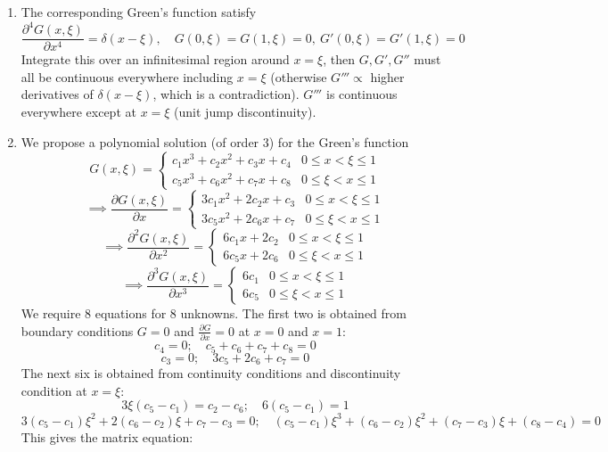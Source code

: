 \documentclass[a4paper]{article}
\begin{document}
\begin{ans}\leavevmode
\begin{enumerate}[label=(\roman*)]
    \item The corresponding Green's function satisfy
    $$\frac{\partial^4G(x,\xi)}{\partial x^4}=\delta(x-\xi),\quad G(0,\xi)=G(1,\xi)=0,~G'(0,\xi)=G'(1,\xi)=0$$
    Integrate this over an infinitesimal region around $x=\xi$, then $G,G',G''$ must all be continuous everywhere including $x=\xi$ (otherwise $G'''\propto$ higher derivatives of $\delta(x-\xi)$, which is a contradiction). $G'''$ is continuous everywhere except at $x=\xi$ (unit jump discontinuity).
    \item We propose a polynomial solution (of order 3) for the Green's function
    $$G(x,\xi)=
    \left\{
        \begin{array}{ll}
      c_1x^3+c_2x^2+c_3x+c_4 & 0\leq x<\xi\leq 1 \\
      c_5x^3+c_6x^2+c_7x+c_8 & 0\leq \xi<x\leq 1
        \end{array}
    \right.$$
    $$\implies\frac{\partial G(x,\xi)}{\partial x}=
    \left\{
        \begin{array}{ll}
      3c_1x^2+2c_2x+c_3 & 0\leq x<\xi\leq 1 \\
      3c_5x^2+2c_6x+c_7 & 0\leq \xi<x\leq 1
        \end{array}
    \right.$$
    $$\implies\frac{\partial^2G(x,\xi)}{\partial x^2}=
    \left\{
        \begin{array}{ll}
      6c_1x+2c_2 & 0\leq x<\xi\leq 1 \\
      6c_5x+2c_6 & 0\leq \xi<x\leq 1
        \end{array}
    \right.$$
    $$\implies\frac{\partial^3G(x,\xi)}{\partial x^3}=
    \left\{
        \begin{array}{ll}
      6c_1 & 0\leq x<\xi\leq 1 \\
      6c_5 & 0\leq \xi<x\leq 1
        \end{array}
    \right.$$
    We require 8 equations for 8 unknowns. The first two is obtained from boundary conditions $G=0$ and $\frac{\partial G}{\partial x}=0$ at $x=0$ and $x=1$:
$$c_4=0;\quad  c_5+c_6+c_7+c_8=0$$
$$c_3=0;\quad  3c_5+2c_6+c_7=0$$
The next six is obtained from continuity conditions and discontinuity condition at $x=\xi$:
$$3\xi(c_5-c_1)=c_2-c_6;\quad6(c_5-c_1)=1$$
$$3(c_5-c_1)\xi^2+2(c_6-c_2)\xi+c_7-c_3=0;\quad(c_5-c_1)\xi^3+(c_6-c_2)\xi^2+(c_7-c_3)\xi+(c_8-c_4)=0$$
This gives the matrix equation:

\end{enumerate}
\end{ans}
\end{document}
